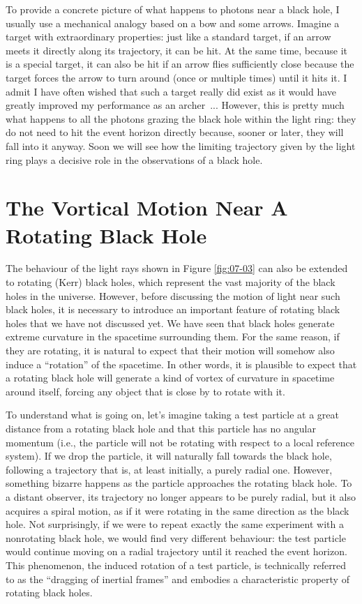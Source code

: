 To provide a concrete picture of what happens to photons near a black hole, I usually
use a mechanical analogy based on a bow and some arrows. Imagine a target with
extraordinary properties: just like a standard target, if an arrow meets it directly
along its trajectory, it can be hit. At the same time, because it is a special target,
it can also be hit if an arrow flies sufficiently close because the target forces the
arrow to turn around (once or multiple times) until it hits it. I admit I have often
wished that such a target really did exist as it would have greatly improved my
performance as an archer~... However, this is pretty much what happens to all the
photons grazing the black hole within the light ring: they do not need to hit the event
horizon directly because, sooner or later, they will fall into it
anyway. Soon we will see how the limiting trajectory given by the light ring plays a
decisive role in the observations of a black hole.

\section{The Vortical Motion Near A Rotating Black Hole}\label{sec:07-rotation}

The behaviour of the light rays shown in Figure \ref{fig:07-03} can also be extended to rotating
(Kerr) black holes, which represent the vast majority of the black holes in the
universe. However, before discussing the motion of light near such black holes, it is
necessary to introduce an important feature of rotating black holes that we have not
discussed yet. We have seen that black holes generate extreme curvature in the spacetime
surrounding them. For the same reason, if they are rotating, it is natural to expect
that their motion will somehow also induce a ``rotation'' of the spacetime. In other
words, it is plausible to expect that a rotating black hole will generate a kind of
vortex of curvature in spacetime around itself, forcing any object that is close by to
rotate with it.

To understand what is going on, let's imagine taking a test particle
at a great distance from a rotating black hole and that this particle has no angular
momentum (i.e., the particle will not be rotating with respect to a local reference
system). If we drop the particle, it will naturally fall towards the black hole,
following a trajectory that is, at least initially, a purely radial one. However,
something bizarre happens as the particle approaches the rotating black hole. To a
distant observer, its trajectory no longer appears to be purely radial, but it also
acquires a spiral motion, as if it were rotating in the same direction as the black
hole. Not surprisingly, if we were to repeat exactly the same experiment with a
nonrotating black hole, we would find very different behaviour: the test particle would
continue moving on a radial trajectory until it reached the event horizon. This
phenomenon, the induced rotation of a test particle, is technically referred to as the
``dragging of inertial frames'' and embodies a characteristic property of rotating black
holes.

